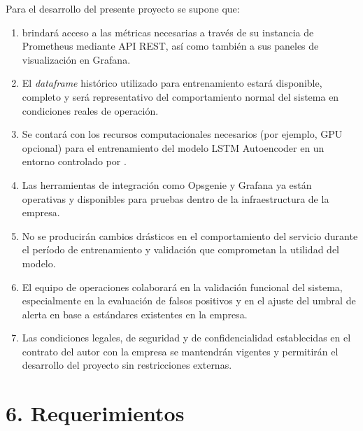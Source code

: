 \documentclass[
11pt, %
]{charter}
\begin{document}
Para el desarrollo del presente proyecto se supone que:

\begin{enumerate}
    \item \clientename  \space brindará acceso a las métricas necesarias a través de su instancia de Prometheus mediante API REST, así como también a sus paneles de visualización en Grafana.
    \item El \textit{dataframe} histórico utilizado para entrenamiento estará disponible, completo y será representativo del comportamiento normal del sistema en condiciones reales de operación.
    \item Se contará con los recursos computacionales necesarios (por ejemplo, GPU opcional) para el entrenamiento del modelo LSTM Autoencoder en un entorno controlado por \clientename.
    \item Las herramientas de integración como Opsgenie y Grafana ya están operativas y disponibles para pruebas dentro de la infraestructura de la empresa.
    \item No se producirán cambios drásticos en el comportamiento del servicio durante el período de entrenamiento y validación que comprometan la utilidad del modelo.
    \item El equipo de operaciones colaborará en la validación funcional del sistema, especialmente en la evaluación de falsos positivos y en el ajuste del umbral de alerta en base a estándares existentes en la empresa.
    \item Las condiciones legales, de seguridad y de confidencialidad establecidas en el contrato del autor con la empresa se mantendrán vigentes y permitirán el desarrollo del proyecto sin restricciones externas.
\end{enumerate}


\section{6. Requerimientos}
\label{sec:requerimientos}
\end{document}
